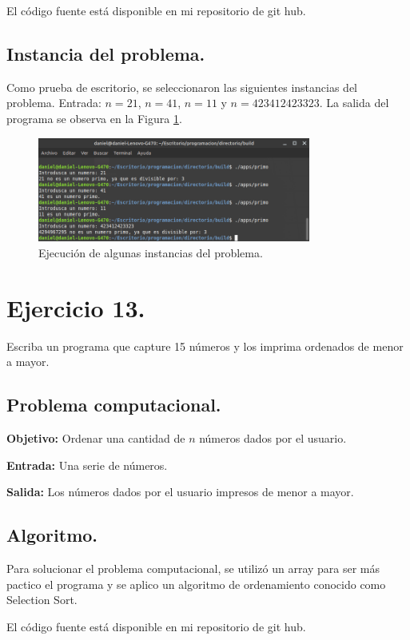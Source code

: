 \documentclass[12pt,letterpaper]{article}
\begin{document}
El código fuente está disponible en mi repositorio de git hub. \cite{url:primo}

\subsection{Instancia del problema.}
Como prueba de escritorio, se seleccionaron las siguientes instancias del problema. Entrada: $n=21$, $n=41$, $n=11$ y $n=423412423323$. La salida del programa se observa en la Figura \ref{fig:primo}.
\begin{figure}[ht!]
  \centering
  \includegraphics[width=0.8\textwidth]{figures/primo}
  \caption{Ejecución de algunas instancias del problema.}
  \label{fig:primo}
\end{figure}


\section{Ejercicio 13.}

Escriba un programa que capture 15 n\'umeros y los imprima ordenados de menor a mayor.

\subsection{Problema computacional.}
\textbf{Objetivo:} Ordenar una cantidad de $n$ n\'umeros dados por el usuario.

\textbf{Entrada:} Una serie de n\'umeros.

\textbf{Salida:} Los n\'umeros dados por el usuario impresos de menor a mayor.

\subsection{Algoritmo.}
Para solucionar el problema computacional, se utiliz\'o un array para ser m\'as pactico el programa y se aplico un algoritmo de ordenamiento conocido como Selection Sort.


El código fuente está disponible en mi repositorio de git hub. \cite{url:ordenar_numeros}
\end{document}
